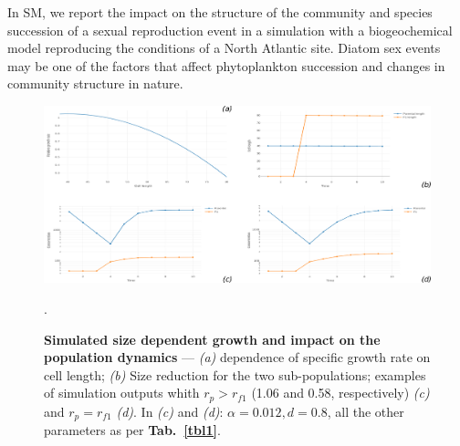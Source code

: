 \documentclass[a4paper,oneside]{article}
\begin{document}
    In SM, we report the impact on the structure of the community and species succession of a sexual reproduction event in a simulation with a biogeochemical model reproducing the conditions of a North Atlantic site.
    Diatom sex events may be one of the factors that affect phytoplankton succession and changes in community structure in nature.
    \begin{figure}[p]
      \includegraphics[width=\linewidth]{imgs/Figpan.pdf}
      \caption{\textbf{Simulated size dependent growth and impact on the population dynamics} ---
        {\color{blue}\textit{(a)}} dependence of specific growth rate on cell length;
        {\color{blue}\textit{(b)}} Size reduction for the two sub-populations;
        examples of simulation outputs whith $r_{p} >r_{f1}$ (1.06 and 0.58, respectively) {\color{blue}\textit{(c)}} and $r_{p} = r_{f1}$ {\color{blue}\textit{(d)}}.
        In {\color{blue}\textit{(c)}} and {\color{blue}\textit{(d)}}: $\alpha=0.012, d = 0.8$, all the other parameters as per \textbf{Tab.~\ref{tbl1}}.
      }\label{fdyn}.
    \end{figure}
\end{document}
